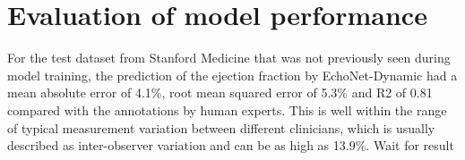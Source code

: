 \vfill
\section{Evaluation of model performance}

For the test dataset from Stanford Medicine that was not previously seen during model training, the prediction of the ejection fraction by EchoNet-Dynamic had a mean absolute error of 4.1\%, root mean squared error of 5.3\% and R2 of 0.81 compared with the annotations by human experts. This is well within the range of typical measurement variation between different clinicians, which is usually described as inter-observer variation and can be as high as 13.9\%. Wait for result
